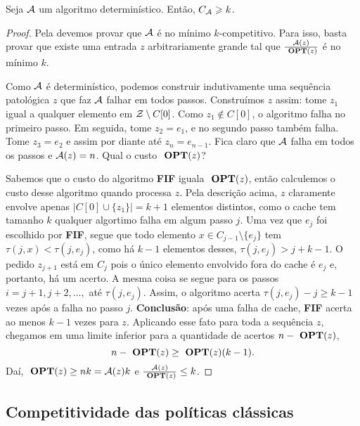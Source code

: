 \begin{theorem}
\label{teo:cota_det}
Seja \(\mathcal{A}\) um algoritmo determinístico. Então, \(C_{\mathcal{A}} \geqslant k\).
\end{theorem}

\begin{proof}

  Pela  devemos provar que \(\mathcal{A}\) é no mínimo \(k\)-competitivo. Para isso, basta provar que existe uma entrada \(z\) arbitrariamente grande tal que \(\frac{\mathcal{A}(z)} {\ \textbf{OPT}(z)}\) é no mínimo \(k\). 

  Como \(\mathcal{A}\) é determinístico, podemos construir indutivamente uma sequência patológica \(z\) que faz \(\mathcal{A}\) falhar em todos passos. Construímos \(z\) assim: tome \(z_1\) igual a qualquer elemento em \(\mathcal{Z} \setminus C[0]\). Como \(z_1 \notin C[0]\), o algoritmo falha no primeiro passo. Em seguida, tome \(z_2 = e_1\), e no segundo passo também falha. Tome \(z_3 = e_2\) e assim por diante até \(z_n = e_{n-1}\). Fica claro que \(\mathcal{A}\) falha em todos os passos e \(\mathcal{A}(z) = n\). Qual o custo \(\ \textbf{OPT}(z)\)?

  Sabemos que o custo do algoritmo \textbf{FIF} iguala \(\ \textbf{OPT}(z)\), então calculemos o custo desse algoritmo quando processa \(z\). Pela descrição acima, \(z\) claramente envolve apenas \(|C[0] \cup \{z_1\}| = k+1\) elementos distintos, como o cache tem tamanho \(k\) qualquer algortimo falha em algum passo \(j\). Uma vez que \(e_j\) foi escolhido por \textbf{FIF}, segue que todo elemento \(x \in C_{j-1} \setminus \{e_j\}\) tem \(\tau(j,x) < \tau(j, e_j)\), como há \(k-1\) elementos desses, \(\tau(j, e_j) > j + k-1\). O pedido \(z_{j+1}\) está em \(C_j\) pois o único elemento envolvido fora do cache é \(e_j\) e, portanto, há um acerto. A mesma coisa se segue para os passos \(i = j+1, j+2, \dotsc,\) até \(\tau(j,e_j)\). Assim, o algoritmo acerta \(\tau(j, e_j) - j \ge k-1\) vezes após a falha no passo \(j\). \textbf{Conclusão}: após uma falha de cache, \textbf{FIF} acerta ao menos \(k-1\) vezes para \(z\). Aplicando esse fato para toda a sequência \(z\), chegamos em uma limite inferior para a quantidade de acertos \(n-\ \textbf{OPT}(z)\),
\begin{equation*}
  n - \ \textbf{OPT}(z) \ge \ \textbf{OPT}(z)(k-1).
\end{equation*}
Daí, \(\ \textbf{OPT}(z) \ge nk = \mathcal{A}(z)k\) e \(\frac{\mathcal{A}(z)}{\ \textbf{OPT}(z)} \le k\).

\end{proof}

\subsection{Competitividade das políticas clássicas}

